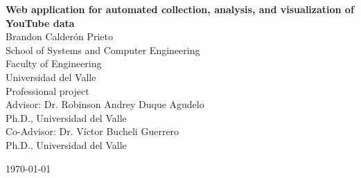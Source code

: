 \begin{titlepage}

	\centering
	{\LARGE\bfseries Web application for automated collection, analysis, and visualization of YouTube data} \\[1 cm]

	{\large Brandon Calderón Prieto} \\[1 cm]

	{\large School of Systems and Computer Engineering} \\[0.3 cm]
	{\large Faculty of Engineering} \\[0.3 cm]
	{\large Universidad del Valle} \\[3 cm]

	{\large Professional project} \\[3 cm]

	{\large Advisor: Dr. Robinson Andrey Duque Agudelo} \\[0.3 cm]
	{\normalsize Ph.D., Universidad del Valle} \\[1 cm]

	{\large Co-Advisor: Dr. Víctor Bucheli Guerrero} \\[0.3 cm]
	{\normalsize Ph.D., Universidad del Valle}

	\vfill

	{\today}
\end{titlepage}
